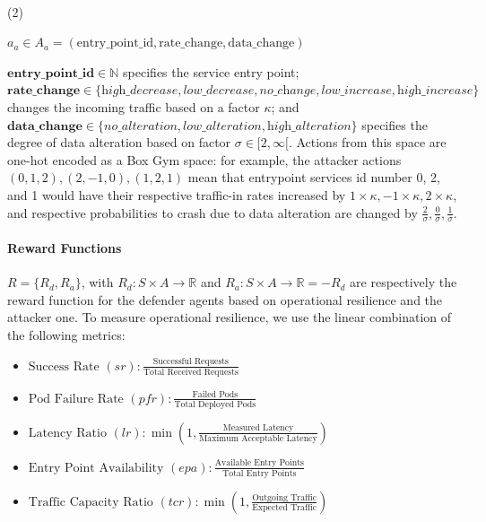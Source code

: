 \

\indent\begin{minipage}{0.06\linewidth}
  (2)
\end{minipage}
\begin{minipage}{0.9\linewidth}
  \raggedright
  $\displaystyle a_a \in A_a = (\text{entry\_point\_id}, \text{rate\_change}, \text{data\_change})$
\end{minipage}

\vspace{0.3cm}

\indent $\mathbf{entry\_point\_id} \in \mathbb{N}$ specifies the service entry point;
$\mathbf{rate\_change} \in \{\textit{high\_decrease}, \textit{low\_decrease}, \textit{no\_change}, \allowbreak \textit{low\_increase}, \allowbreak \textit{high\_increase}\}$ changes the incoming traffic based on a factor $\kappa$; and $\mathbf{data\_change} \in \{\textit{no\_alteration}, \allowbreak \textit{low\_alteration}, \allowbreak \textit{high\_alteration}\}$ specifies the degree of data alteration based on factor $\sigma \in [2,\infty[$. Actions from this space are one-hot encoded as a Box Gym space: for example, the attacker actions $(0,1,2), (2,-1,0), (1,2,1)$ mean that entrypoint services id number 0, 2, and 1 would have their respective traffic-in rates increased by $1 \times \kappa, -1 \times \kappa, 2 \times \kappa$, and respective probabilities to crash due to data alteration are changed by $\frac{2}{\sigma}, \frac{0}{\sigma}, \frac{1}{\sigma}$.


\noindent \paragraph{\textbf{Reward Functions}} $R = \{R_d, R_a\}$, with $R_d: S \times A \to \mathbb{R}$ and $R_a: S \times A \to \mathbb{R} = - R_d$ are respectively the reward function for the defender agents based on operational resilience and the attacker one.
To measure operational resilience, we use the linear combination of the following metrics:
%
\begin{itemize}
  \vspace{0.15cm}
  \item $\text{Success Rate } (sr) : \frac{\text{Successful Requests}}{\text{Total Received Requests}}$
        \vspace{0.15cm}
  \item $\text{Pod Failure Rate } (pfr) : \frac{\text{Failed Pods}}{\text{Total Deployed Pods}}$
        \vspace{0.15cm}
  \item $\text{Latency Ratio } (lr) : \min\left(1,\frac{\text{Measured Latency}}{\text{Maximum Acceptable Latency}}\right)$
        \vspace{0.15cm}
  \item $\text{Entry Point Availability } (epa) : \frac{\text{Available Entry Points}}{\text{Total Entry Points}}$
        \vspace{0.15cm}
  \item $\text{Traffic Capacity Ratio } (tcr) : \min\left(1, \frac{\text{Outgoing Traffic}}{\text{Expected Traffic}}\right)$
\end{itemize}

